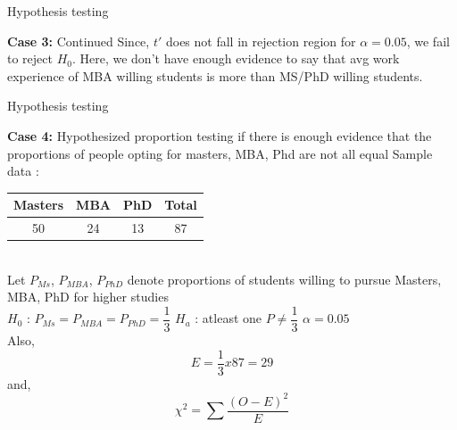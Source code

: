 \documentclass{beamer}
\begin{document}
\begin{frame}{Hypothesis testing}
    \begin{block}{\textbf{Case 3:} Continued}
        Since, $t'$ does not fall in rejection region for $\alpha=0.05$, we fail to reject $H_0$.
        Here, we don't have enough evidence to say that avg work experience of MBA willing students is more than MS/PhD willing students.
    \end{block}
\end{frame}

\begin{frame}{Hypothesis testing}

    \begin{block}{\textbf{Case 4:} Hypothesized proportion testing if there is
            enough evidence that the proportions of people opting for masters,
            MBA, Phd are
            not all equal}
        Sample data :
        \begin{tabular}{|c|c|c|c|}
            \hline
            Masters & MBA & PhD & Total \\
            \hline
            50      & 24  & 13  & 87    \\
            \hline
        \end{tabular}\\

        Let $P_{Ms}$, $P_{MBA}$, $P_{PhD}$ denote proportions of students
        willing
        to pursue Masters, MBA, PhD for higher studies \\

        $H_{0}$ :  $P_{Ms} = P_{MBA} = P_{PhD} = \dfrac{1}{3}$ \space \space
        \space
        \space $H_{a}$ : atleast one $P \neq \dfrac{1}{3}$\space \space \space
        \space
        $\alpha =0.05$\\

        Also,
        \begin{equation}
            E = \dfrac{1}{3} x 87 = 29
        \end{equation}
        and,
        \begin{equation}
            \chi^{2} = \sum\dfrac{(O - E)^{2}}{E}
        \end{equation}
    \end{block}
\end{frame}
\end{document}

